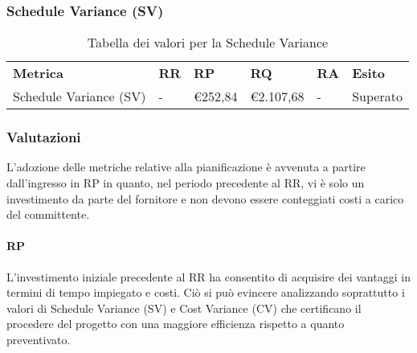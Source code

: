 \newpage
\subsubsection{Schedule Variance (SV)}
\renewcommand{\arraystretch}{2.2}
\begin{longtable}{|C{4.5cm}|C{1.5cm}|C{1.5cm}|C{1.5cm}|C{1.5cm}|C{1.5cm}|}

	\caption{Tabella dei valori per la Schedule Variance}\\
	\hline

	\textbf{Metrica} & \textbf{RR}  & \textbf{RP} & \textbf{RQ} & \textbf{RA} & \textbf{Esito}
	\tabularnewline
	\endfirsthead

	Schedule Variance (SV) & -  & \euro252,84 & \euro2.107,68 & - & Superato
\end{longtable}
\begin{center}
\end{center}

\newpage
\subsubsection{Valutazioni}
L'adozione delle metriche relative alla pianificazione è avvenuta a partire dall'ingresso in RP in quanto, nel periodo precedente al RR, vi è solo un investimento da parte del fornitore e non devono essere conteggiati costi a carico del committente.

\paragraph{RP}
L'investimento iniziale precedente al RR ha consentito di acquisire dei vantaggi in termini di tempo impiegato e costi. Ciò si può evincere analizzando soprattutto i valori di Schedule Variance (SV) e Cost Variance (CV) che certificano il procedere del progetto con una maggiore efficienza rispetto a quanto preventivato.


